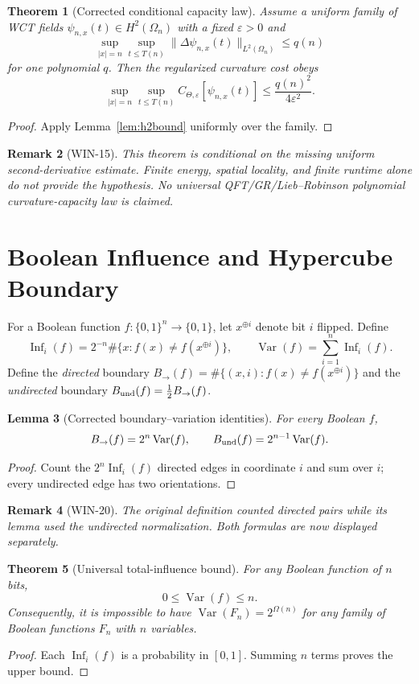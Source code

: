 \documentclass[11pt,a4paper]{article}
\newtheorem{theorem}{Theorem}[section]
\newtheorem{lemma}[theorem]{Lemma}
\newtheorem{remark}[theorem]{Remark}
\newcommand{\CTheta}{C_{\Theta,\varepsilon}}
\begin{document}
\begin{theorem}[Corrected conditional capacity law]
\label{thm:capacity}
Assume a uniform family of WCT fields $\psi_{n,x}(t)\in H^2(\Omega_n)$
with a fixed $\varepsilon>0$ and
\[
\sup_{|x|=n}\sup_{t\le T(n)}
\|\Delta\psi_{n,x}(t)\|_{L^2(\Omega_n)}\le q(n)
\]
for one polynomial $q$. Then the regularized curvature cost obeys
\[
\sup_{|x|=n}\sup_{t\le T(n)}
\CTheta[\psi_{n,x}(t)]\le\frac{q(n)^2}{4\varepsilon^2}.
\]
\end{theorem}
\begin{proof}
Apply Lemma~\ref{lem:h2bound} uniformly over the family.
\end{proof}
\begin{remark}[WIN-15]
This theorem is conditional on the missing uniform second-derivative
estimate. Finite energy, spatial locality, and finite runtime alone do not
provide the hypothesis. No universal QFT/GR/Lieb--Robinson polynomial
curvature-capacity law is claimed.
\end{remark}

\section{Boolean Influence and Hypercube Boundary}
\label{sec:boundary_capacity}
For a Boolean function $f:\{0,1\}^n\to\{0,1\}$, let $x^{\oplus i}$
denote bit $i$ flipped. Define
\[
\operatorname{Inf}_i(f)=2^{-n}\#\{x:f(x)\ne f(x^{\oplus i})\},
\qquad \operatorname{Var}(f)=\sum_{i=1}^n\operatorname{Inf}_i(f).
\]
Define the \emph{directed} boundary
$B_{\to}(f)=\#\{(x,i):f(x)\ne f(x^{\oplus i})\}$ and the
\emph{undirected} boundary
$B_{\rm und}(f)=\tfrac12B_{\to}(f)$.

\begin{lemma}[Corrected boundary--variation identities]
\label{lem:boundary_variation}
For every Boolean $f$,
\[
B_{\to}(f)=2^n\operatorname{Var}(f),\qquad
B_{\rm und}(f)=2^{n-1}\operatorname{Var}(f).
\]
\end{lemma}
\begin{proof}
Count the $2^n\operatorname{Inf}_i(f)$ directed edges in coordinate
$i$ and sum over $i$; every undirected edge has two orientations.
\end{proof}
\begin{remark}[WIN-20]
The original definition counted directed pairs while its lemma used the
undirected normalization. Both formulas are now displayed separately.
\end{remark}

\begin{theorem}[Universal total-influence bound]
\label{thm:influence}
For any Boolean function of $n$ bits,
\[
0\le\operatorname{Var}(f)\le n.
\]
Consequently, it is impossible to have
$\operatorname{Var}(F_n)=2^{\Omega(n)}$ for any family of Boolean
functions $F_n$ with $n$ variables.
\end{theorem}
\begin{proof}
Each $\operatorname{Inf}_i(f)$ is a probability in $[0,1]$.
Summing $n$ terms proves the upper bound.
\end{proof}
\end{document}
